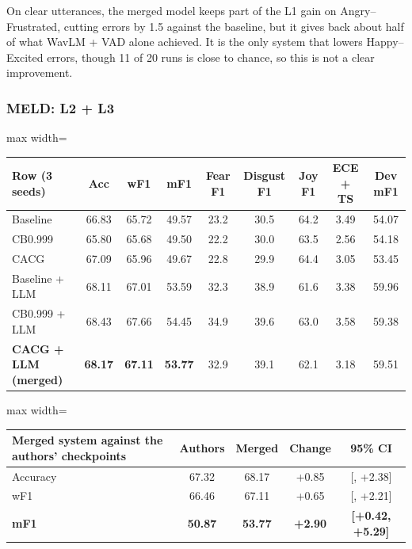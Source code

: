 \documentclass[11pt,a4paper]{article}
\newcommand{\mn}{\textminus}
\begin{document}
On clear utterances, the merged model keeps part of the L1 gain on Angry--Frustrated, cutting errors by 1.5 against the baseline, but it gives back about half of what WavLM + VAD alone achieved. It is the only system that lowers Happy--Excited errors, though 11 of 20 runs is close to chance, so this is not a clear improvement.

\subsubsection{MELD: L2 + L3}

\begin{center}
\begin{adjustbox}{max width=\linewidth}
\begin{tabular}{lcccccccc}
\toprule
Row (3 seeds) & Acc & wF1 & mF1 & Fear F1 & Disgust F1 & Joy F1 & ECE + TS & Dev mF1 \\
\midrule
Baseline & 66.83 & 65.72 & 49.57 & 23.2 & 30.5 & 64.2 & 3.49 & 54.07 \\
CB0.999 & 65.80 & 65.68 & 49.50 & 22.2 & 30.0 & 63.5 & 2.56 & 54.18 \\
CACG & 67.09 & 65.96 & 49.67 & 22.8 & 29.9 & 64.4 & 3.05 & 53.45 \\
Baseline + LLM & 68.11 & 67.01 & 53.59 & 32.3 & 38.9 & 61.6 & 3.38 & 59.96 \\
CB0.999 + LLM & 68.43 & 67.66 & 54.45 & 34.9 & 39.6 & 63.0 & 3.58 & 59.38 \\
\textbf{CACG + LLM (merged)} & \textbf{68.17} & \textbf{67.11} & \textbf{53.77} & 32.9 & 39.1 & 62.1 & 3.18 & 59.51 \\
\bottomrule
\end{tabular}
\end{adjustbox}
\end{center}

\begin{center}
\begin{adjustbox}{max width=\linewidth}
\begin{tabular}{lcccc}
\toprule
Merged system against the authors' checkpoints & Authors & Merged & Change & 95\% CI \\
\midrule
Accuracy & 67.32 & 68.17 & +0.85 & [\mn0.69, +2.38] \\
wF1 & 66.46 & 67.11 & +0.65 & [\mn0.94, +2.21] \\
\textbf{mF1} & \textbf{50.87} & \textbf{53.77} & \textbf{+2.90} & \textbf{[+0.42, +5.29]} \\
\bottomrule
\end{tabular}
\end{adjustbox}
\end{center}
\end{document}
